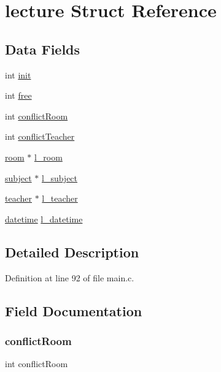 \hypertarget{structlecture}{}\section{lecture Struct Reference}
\label{structlecture}
\subsection*{Data Fields}
\begin{DoxyCompactItemize}
\item 
int \hyperlink{structlecture_a795ea50921b36311ffd5e7baa2ef1f7e}{init}
\item 
int \hyperlink{structlecture_a4573817871ec032055c7d539617626fe}{free}
\item 
int \hyperlink{structlecture_a3ae883675cb032bec1040a71a363631d}{conflict\+Room}
\item 
int \hyperlink{structlecture_a5459cfc525141e5592d505c28d625d96}{conflict\+Teacher}
\item 
\hyperlink{structroom}{room} $\ast$ \hyperlink{structlecture_ac9357ac63b26ca97ed45bca4e1b7134c}{l\+\_\+room}
\item 
\hyperlink{structsubject}{subject} $\ast$ \hyperlink{structlecture_a104b8fe6246b0cdbadf51b2c4b718002}{l\+\_\+subject}
\item 
\hyperlink{structteacher}{teacher} $\ast$ \hyperlink{structlecture_a4299a0a67212d8dd0ed38c7fc5a9d3eb}{l\+\_\+teacher}
\item 
\hyperlink{structdatetime}{datetime} \hyperlink{structlecture_a31d3e72684a3e6f8c76c85a468468efa}{l\+\_\+datetime}
\end{DoxyCompactItemize}


\subsection{Detailed Description}


Definition at line 92 of file main.\+c.



\subsection{Field Documentation}
\hypertarget{structlecture_a3ae883675cb032bec1040a71a363631d}{}\label{structlecture_a3ae883675cb032bec1040a71a363631d} 
\subsubsection{\texorpdfstring{conflict\+Room}{conflictRoom}}
{\footnotesize\ttfamily int conflict\+Room}



